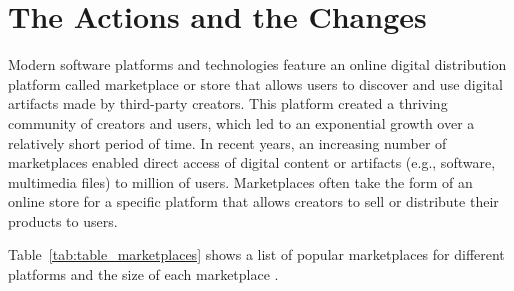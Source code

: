 \section{The Actions and the Changes}
Modern software platforms and technologies feature an online digital distribution platform called marketplace or store that allows users to discover and use digital artifacts made by third-party creators.
This platform created a thriving community of creators and users, which led to an exponential growth over a relatively short period of time.
In recent years, an increasing number of marketplaces enabled direct access of digital content or artifacts (e.g., software, multimedia files) to million of users.
Marketplaces often take the form of an online store for a specific platform that allows creators to sell or distribute their products to users.
\begin{table}[h]
	\caption{Several popular digital marketplaces for different platforms.}
	\label{tab:table_marketplaces}
\end{table}
Table~\ref{tab:table_marketplaces} shows a list of popular marketplaces for different platforms and the size of each marketplace \cite{statista_app_stores, pinshape, wikipedia_chrome_web_store}.
